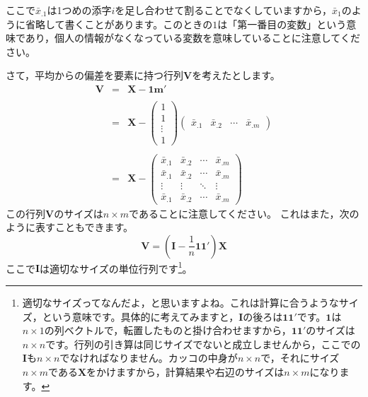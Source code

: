 \documentclass{ltjsbook}
\begin{document}
ここで$\bar{x}_{.1}$は1つめの添字$i$を足し合わせて割ることでなくしていますから，$\bar{x}_1$のように省略して書くことがあります。このときの$1$は「第一番目の変数」という意味であり，個人の情報がなくなっている変数を意味していることに注意してください。

さて，平均からの偏差を要素に持つ行列$\bm{V}$を考えたとします。
\[
    \begin{array}{ccl}
        \bm{V} & = & \bm{X} - \bm{1} \bm{m}'                                                                                                                  \\
               &   &                                                                                                                                          \\
               & = & \bm{X} - \begin{pmatrix} 1 \\ 1 \\ \vdots \\ 1 \end{pmatrix} \begin{pmatrix} \bar{x}_{.1} & \bar{x}_{.2} & \cdots & \bar{x}_{.m} \end{pmatrix} \\
               &   &                                                                                                                                          \\
               & = & \bm{X} - \begin{pmatrix} \bar{x}_{.1} & \bar{x}_{.2} & \cdots & \bar{x}_{.m} \\
                \bar{x}_{.1} & \bar{x}_{.2} & \cdots & \bar{x}_{.m} \\
                \vdots     & \vdots     & \ddots & \vdots     \\
                \bar{x}_{.1} & \bar{x}_{.2} & \cdots & \bar{x}_{.m}\end{pmatrix}
    \end{array}
\]
この行列$\bm{V}$のサイズは$n \times m$であることに注意してください。
これはまた，次のように表すこともできます。
\[ \bm{V} = ( \bm{I} -\frac{1}{n}\bm{1} \bm{1} ')\bm{X} \]
ここで$\bm{I}$は適切なサイズの単位行列です\footnote{適切なサイズってなんだよ，と思いますよね。これは計算に合うようなサイズ，という意味です。具体的に考えてみますと，$\bm{I}$の後ろは$\bm{1}\bm{1}'$です。$\bm{1}$は$n\times 1$の列ベクトルで，転置したものと掛け合わせますから，$\bm{1}\bm{1}'$のサイズは$n \times n$です。行列の引き算は同じサイズでないと成立しませんから，ここでの$\bm{I}$も$n \times n$でなければなりません。カッコの中身が$n \times n$で，それにサイズ$n \times m$である$\bm{X}$をかけますから，計算結果や右辺のサイズは$n \times m$になります。}。
\end{document}
